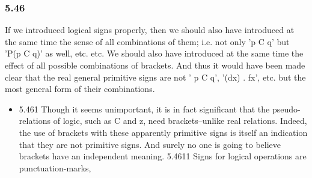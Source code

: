 \documentclass[11pt]{article}
\begin{document}
\subsubsection*{5.46}
\label{sec:orgb0995b1}
If we introduced logical signs properly, then we should also have
introduced at the same time the sense of all combinations of them; i.e. not
only 'p C q' but 'P(p C q)' as well, etc. etc. We should also have
introduced at the same time the effect of all possible combinations of
brackets. And thus it would have been made clear that the real general
primitive signs are not ' p C q', '(dx) . fx', etc. but the most general
form of their combinations.
\begin{itemize}
\item 5.461
\label{sec:orgb54fce8}
Though it seems unimportant, it is in fact significant that the
pseudo-relations of logic, such as C and z, need brackets--unlike real
relations. Indeed, the use of brackets with these apparently primitive
signs is itself an indication that they are not primitive signs. And surely
no one is going to believe brackets have an independent meaning. 5.4611
Signs for logical operations are punctuation-marks,
\end{itemize}
\end{document}
